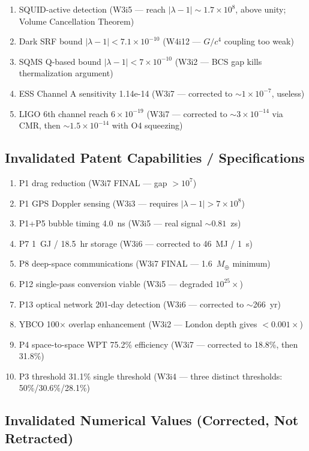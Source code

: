 \documentclass[11pt]{article}
\newcommand{\ee}[1]{\times 10^{#1}}
\newcommand{\lamdiff}{|\lambda{-}1|}
\begin{document}
\begin{enumerate}
\item SQUID-active detection (W3i5 --- reach $\lamdiff \sim 1.7\ee{8}$,
  above unity; Volume Cancellation Theorem)
\item Dark SRF bound $\lamdiff < 7.1\ee{-10}$ (W4i12 --- $G/c^4$
  coupling too weak)
\item SQMS Q-based bound $\lamdiff < 7\ee{-10}$ (W3i2 --- BCS gap kills
  thermalization argument)
\item ESS Channel A sensitivity 1.14e-14 (W3i7 --- corrected to
  $\sim 1\ee{-7}$, useless)
\item LIGO 6th channel reach $6\ee{-19}$ (W3i7 --- corrected to
  $\sim 3\ee{-14}$ via CMR, then $\sim 1.5\ee{-14}$ with O4 squeezing)
\end{enumerate}

\subsection{Invalidated Patent Capabilities / Specifications}

\begin{enumerate}
\item P1 drag reduction (W3i7 FINAL --- gap $> 10^7$)
\item P1 GPS Doppler sensing (W3i3 --- requires $\lamdiff > 7\ee{8}$)
\item P1+P5 bubble timing 4.0~ns (W3i5 --- real signal $\sim 0.81$~zs)
\item P7 1~GJ / 18.5~hr storage (W3i6 --- corrected to 46~MJ / 1~s)
\item P8 deep-space communications (W3i7 FINAL --- 1.6~$M_\oplus$ minimum)
\item P12 single-pass conversion viable (W3i5 --- degraded $10^{25}\times$)
\item P13 optical network 201-day detection (W3i6 --- corrected to $\sim$266~yr)
\item YBCO 100$\times$ overlap enhancement (W3i2 --- London depth gives
  $<0.001\times$)
\item P4 space-to-space WPT 75.2\% efficiency (W3i7 --- corrected to
  18.8\%, then 31.8\%)
\item P3 threshold 31.1\% single threshold (W3i4 --- three distinct
  thresholds: 50\%/30.6\%/28.1\%)
\end{enumerate}

\subsection{Invalidated Numerical Values (Corrected, Not Retracted)}
\end{document}
